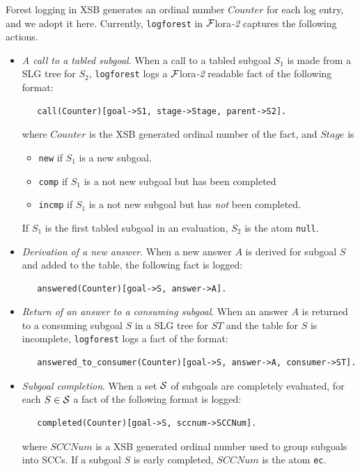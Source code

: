 \documentclass[11pt]{article}
\newcommand{\FLORA}{{\mbox{\sc ${\cal F}${lora}\rm\emph{-2}}}\xspace}
\begin{document}
Forest logging in XSB generates an ordinal number $Counter$ for each log entry, and
we adopt it here. Currently, {\tt logforest} in \FLORA captures the following actions.
\begin{itemize}
\item \emph{A call to a tabled subgoal}. When a call to a tabled subgoal $S_1$ is
  made from a SLG tree for $S_2$, {\tt logforest} logs a \FLORA readable fact of 
  the following format:
\begin{verbatim}
   call(Counter)[goal->S1, stage->Stage, parent->S2].
\end{verbatim}
  where $Counter$ is the XSB generated ordinal number of the fact, and $Stage$ is
  \begin{itemize}
  \item {\tt new} if $S_1$ is a new subgoal.
  \item {\tt comp} if $S_1$ is a not new subgoal but has been completed
  \item {\tt incmp} if $S_1$ is a not new subgoal but has \emph{not} been completed.
  \end{itemize}
  If $S_1$ is the first tabled subgoal in an evaluation, $S_2$ is the atom {\tt null}.

\item \emph{Derivation of a new answer}. When a new answer $A$ is derived for 
  subgoal $S$ and added to the table, the following fact is logged:
\begin{verbatim}
   answered(Counter)[goal->S, answer->A].
\end{verbatim}

\item \emph{Return of an answer to a consuming subgoal}. When an answer $A$ is
  returned to a consuming subgoal $S$ in a SLG tree for $ST$ and the table for $S$
  is incomplete, {\tt logforest} logs a fact of the format:
\begin{verbatim}  
   answered_to_consumer(Counter)[goal->S, answer->A, consumer->ST].
\end{verbatim}  

\item \emph{Subgoal completion}. When a set ${\cal S}$ of subgoals are 
  completely evaluated, for each $S \in {\cal S}$ a fact of the following
  format is logged:
\begin{verbatim}  
   completed(Counter)[goal->S, sccnum->SCCNum].
\end{verbatim}  
  where $SCCNum$ is a XSB generated ordinal number used to group subgoals into
  SCCs. If a subgoal $S$ is early completed, $SCCNum$ is the atom {\tt ec}. 
  

\end{itemize}
\end{document}
